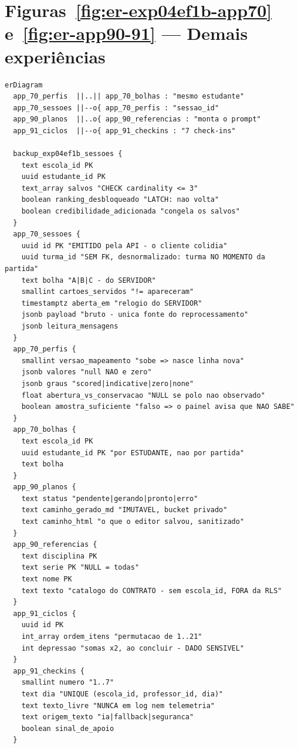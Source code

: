 \section{Figuras~\ref{fig:er-exp04ef1b-app70} e~\ref{fig:er-app90-91} --- Demais experiências}

\begin{lstlisting}[language=mermaid]
erDiagram
  app_70_perfis  ||..|| app_70_bolhas : "mesmo estudante"
  app_70_sessoes ||--o{ app_70_perfis : "sessao_id"
  app_90_planos  ||..o{ app_90_referencias : "monta o prompt"
  app_91_ciclos  ||--o{ app_91_checkins : "7 check-ins"

  backup_exp04ef1b_sessoes {
    text escola_id PK
    uuid estudante_id PK
    text_array salvos "CHECK cardinality <= 3"
    boolean ranking_desbloqueado "LATCH: nao volta"
    boolean credibilidade_adicionada "congela os salvos"
  }
  app_70_sessoes {
    uuid id PK "EMITIDO pela API - o cliente colidia"
    uuid turma_id "SEM FK, desnormalizado: turma NO MOMENTO da partida"
    text bolha "A|B|C - do SERVIDOR"
    smallint cartoes_servidos "!= apareceram"
    timestamptz aberta_em "relogio do SERVIDOR"
    jsonb payload "bruto - unica fonte do reprocessamento"
    jsonb leitura_mensagens
  }
  app_70_perfis {
    smallint versao_mapeamento "sobe => nasce linha nova"
    jsonb valores "null NAO e zero"
    jsonb graus "scored|indicative|zero|none"
    float abertura_vs_conservacao "NULL se polo nao observado"
    boolean amostra_suficiente "falso => o painel avisa que NAO SABE"
  }
  app_70_bolhas {
    text escola_id PK
    uuid estudante_id PK "por ESTUDANTE, nao por partida"
    text bolha
  }
  app_90_planos {
    text status "pendente|gerando|pronto|erro"
    text caminho_gerado_md "IMUTAVEL, bucket privado"
    text caminho_html "o que o editor salvou, sanitizado"
  }
  app_90_referencias {
    text disciplina PK
    text serie PK "NULL = todas"
    text nome PK
    text texto "catalogo do CONTRATO - sem escola_id, FORA da RLS"
  }
  app_91_ciclos {
    uuid id PK
    int_array ordem_itens "permutacao de 1..21"
    int depressao "somas x2, ao concluir - DADO SENSIVEL"
  }
  app_91_checkins {
    smallint numero "1..7"
    text dia "UNIQUE (escola_id, professor_id, dia)"
    text texto_livre "NUNCA em log nem telemetria"
    text origem_texto "ia|fallback|seguranca"
    boolean sinal_de_apoio
  }
\end{lstlisting}

